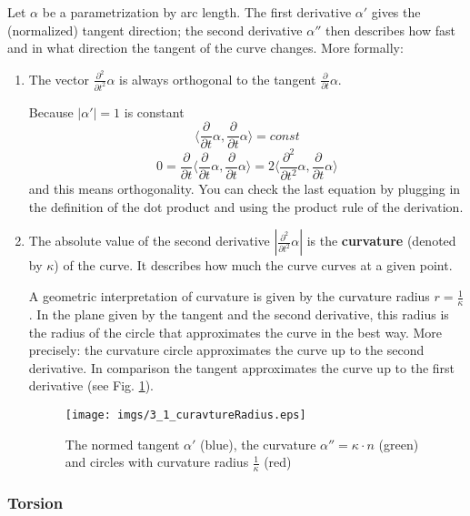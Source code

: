 Let $\alpha$ be a parametrization by arc length. The first derivative $\alpha'$ gives the (normalized) tangent direction; the second derivative $\alpha''$ then describes how fast and in what direction the tangent of the curve changes. More formally:
\begin{enumerate}
\item The vector $\frac{\partial^2 }{\partial t^2} \alpha$ is always orthogonal to the tangent $\frac{\partial}{\partial t} \alpha$. 

Because $|\alpha'|= 1$ is constant 
\[\langle \frac{\partial}{\partial t} \alpha,\frac{\partial}{\partial t} \alpha\rangle = const\]
\[0=\frac{\partial}{\partial t} \langle \frac{\partial}{\partial t} \alpha,\frac{\partial}{\partial t} \alpha\rangle = 2 \langle \frac{\partial^2}{\partial t^2} \alpha,\frac{\partial}{\partial t} \alpha\rangle\]
and this means orthogonality. You can check the last equation by plugging in the definition of the dot product and using the product rule of the derivation.
\item The absolute value of the second derivative $|\frac{\partial^2}{\partial t^2} \alpha|$ is the \textbf{curvature} (denoted by $\kappa$) of the curve. It describes how much the curve curves at a given point. 

A geometric interpretation of curvature is given by the curvature radius $r= \frac{1}{\kappa}$. In the plane given by the tangent and the second derivative, this radius is the radius of the circle that approximates the curve in the best way. More precisely: the curvature circle approximates the curve up to the second derivative. In comparison the tangent approximates the curve up to the first derivative (see Fig. \ref{fig::3_1_curvatureRadius}). 
\begin{figure}[h]
\begin{center}
\texttt{[image: imgs/3\_1\_curavtureRadius.eps]}
\end{center}
\caption{The normed tangent $\alpha'$ (blue), the curvature $\alpha'' = \kappa \cdot n$ (green) and circles with curvature radius $\frac{1}{\kappa}$ (red)}
\label{fig::3_1_curvatureRadius}
\end{figure}
\end{enumerate}

\subsubsection{Torsion}

